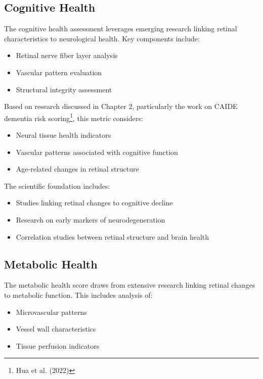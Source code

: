 \documentclass[
  Letterpaper,
]{scrbook}
\providecommand{\tightlist}{%
  \setlength{\itemsep}{0pt}\setlength{\parskip}{0pt}}\usepackage{longtable,booktabs,array}
\begin{document}
\subsection{Cognitive Health}\label{cognitive-health}

The cognitive health assessment leverages emerging research linking
retinal characteristics to neurological health. Key components include:

\begin{itemize}
\tightlist
\item
  Retinal nerve fiber layer analysis
\item
  Vascular pattern evaluation
\item
  Structural integrity assessment
\end{itemize}

Based on research discussed in Chapter 2, particularly the work on CAIDE
dementia risk scoring\footnote{Hua et al. (2022)}, this metric
considers:

\begin{itemize}
\tightlist
\item
  Neural tissue health indicators
\item
  Vascular patterns associated with cognitive function
\item
  Age-related changes in retinal structure
\end{itemize}

The scientific foundation includes:

\begin{itemize}
\tightlist
\item
  Studies linking retinal changes to cognitive decline
\item
  Research on early markers of neurodegeneration
\item
  Correlation studies between retinal structure and brain health
\end{itemize}

\subsection{Metabolic Health}\label{metabolic-health}

The metabolic health score draws from extensive research linking retinal
changes to metabolic function. This includes analysis of:

\begin{itemize}
\tightlist
\item
  Microvascular patterns
\item
  Vessel wall characteristics
\item
  Tissue perfusion indicators
\end{itemize}
\end{document}
